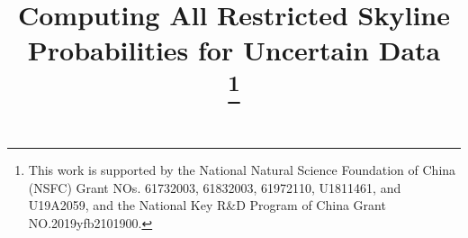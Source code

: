 \documentclass[conference]{IEEEtran}
\begin{document}
\newcommand{\eat}[1]{}
\newcommand{\eg}{{\textrm{e.g.}}\xspace}
\newcommand{\etc}{{\textrm{etc.}}\xspace}
\newcommand{\ie}{{\textrm{i.e.}}\xspace}
\newcommand{\etal}{{\textrm{et al.}}\xspace}
\newcommand{\resp}{{\textrm{resp.}}\xspace}
\newcommand{\calD}{\mathcal{D}}
\newcommand{\calF}{\mathcal{F}}
\newcommand{\simplex}{\mathbb{S}}
\newcommand{\real}{\mathbb{R}\xspace}
\newcommand{\SKY}{{\rm SKY}}
\newcommand{\RSKY}{{\rm RSKY}}

\newtheorem{definition}{Definition}
\newtheorem{theorem}{Theorem}
\newtheorem{lemma}{Lemma}
\newtheorem{corollary}{Corollary}
\newtheorem{proposition}{Proposition}
\newtheorem{claim}{Claim}
\newtheorem{observation}{Observation}
\newtheorem{example}{Example}
\newtheorem{problem}{Problem}


\makeatletter
\newcommand{\removelatexerror}{\let\@latex@error\@gobble}
\makeatother

\title{Computing All Restricted Skyline Probabilities for Uncertain Data\\
\thanks{This work is supported by the National Natural Science Foundation of China (NSFC) Grant NOs. 61732003, 61832003, 61972110, U1811461, and U19A2059, and the National Key R\&D Program of China Grant NO.2019yfb2101900.}
}


\author{
\and
{} 
\and
{}
}

\maketitle
\end{document}
